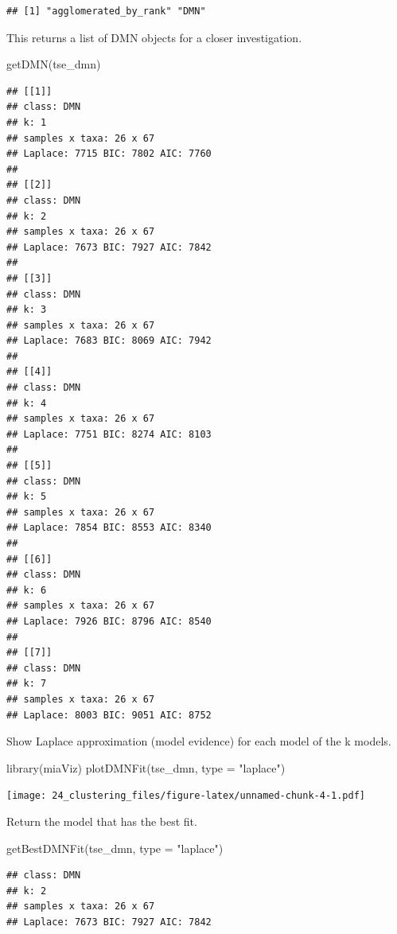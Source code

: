 \documentclass[
]{book}
\newenvironment{Shaded}{\begin{snugshade}}{\end{snugshade}}
\newcommand{\AttributeTok}[1]{\textcolor[rgb]{0.77,0.63,0.00}{#1}}
\newcommand{\FunctionTok}[1]{\textcolor[rgb]{0.00,0.00,0.00}{#1}}
\newcommand{\NormalTok}[1]{#1}
\newcommand{\StringTok}[1]{\textcolor[rgb]{0.31,0.60,0.02}{#1}}
\begin{document}
\begin{verbatim}
## [1] "agglomerated_by_rank" "DMN"
\end{verbatim}

This returns a list of DMN objects for a closer investigation.

\begin{Shaded}
\begin{Highlighting}[]
\FunctionTok{getDMN}\NormalTok{(tse\_dmn)}
\end{Highlighting}
\end{Shaded}

\begin{verbatim}
## [[1]]
## class: DMN 
## k: 1 
## samples x taxa: 26 x 67 
## Laplace: 7715 BIC: 7802 AIC: 7760 
## 
## [[2]]
## class: DMN 
## k: 2 
## samples x taxa: 26 x 67 
## Laplace: 7673 BIC: 7927 AIC: 7842 
## 
## [[3]]
## class: DMN 
## k: 3 
## samples x taxa: 26 x 67 
## Laplace: 7683 BIC: 8069 AIC: 7942 
## 
## [[4]]
## class: DMN 
## k: 4 
## samples x taxa: 26 x 67 
## Laplace: 7751 BIC: 8274 AIC: 8103 
## 
## [[5]]
## class: DMN 
## k: 5 
## samples x taxa: 26 x 67 
## Laplace: 7854 BIC: 8553 AIC: 8340 
## 
## [[6]]
## class: DMN 
## k: 6 
## samples x taxa: 26 x 67 
## Laplace: 7926 BIC: 8796 AIC: 8540 
## 
## [[7]]
## class: DMN 
## k: 7 
## samples x taxa: 26 x 67 
## Laplace: 8003 BIC: 9051 AIC: 8752
\end{verbatim}

Show Laplace approximation (model evidence) for each model of the k models.

\begin{Shaded}
\begin{Highlighting}[]
\FunctionTok{library}\NormalTok{(miaViz)}
\FunctionTok{plotDMNFit}\NormalTok{(tse\_dmn, }\AttributeTok{type =} \StringTok{"laplace"}\NormalTok{)}
\end{Highlighting}
\end{Shaded}

\texttt{[image: 24\_clustering\_files/figure-latex/unnamed-chunk-4-1.pdf]}

Return the model that has the best fit.

\begin{Shaded}
\begin{Highlighting}[]
\FunctionTok{getBestDMNFit}\NormalTok{(tse\_dmn, }\AttributeTok{type =} \StringTok{"laplace"}\NormalTok{)}
\end{Highlighting}
\end{Shaded}

\begin{verbatim}
## class: DMN 
## k: 2 
## samples x taxa: 26 x 67 
## Laplace: 7673 BIC: 7927 AIC: 7842
\end{verbatim}
\end{document}
